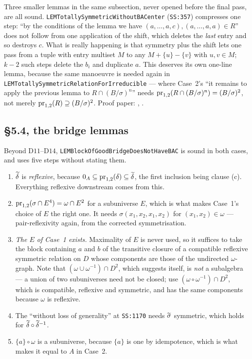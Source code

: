 Three smaller lemmas in the same subsection, never opened before the final
pass, are all sound. \texttt{LEMTotallySymmetricWithoutBACenter}
(\texttt{SS:357}) compresses one step: ``by the conditions of the lemma we have
$(a,\dots,a,c),(a,\dots,a,a)\in R$'' does not follow from one application of
the shift, which deletes the \emph{last} entry and so destroys $c$. What is
really happening is that symmetry plus the shift lets one pass from a tuple
with entry multiset $M$ to any $M+\{u\}-\{v\}$ with $u,v\in M$; $k-2$ such
steps delete the $b_{i}$ and duplicate $a$. This deserves its own one-line
lemma, because the same manoeuvre is needed again in
\texttt{LEMTotallySymmetricRelationForIrreducible} --- where Case~2's ``it
remains to apply the previous lemma to $R\cap(B/\sigma)^{n}$'' needs
$\operatorname*{pr}_{1,2}(R\cap(B/\sigma)^{n})=(B/\sigma)^{2}$, not merely
$\operatorname*{pr}_{1,2}(R)\supseteq(B/\sigma)^{2}$. Proof paper:
, .

\subsection{\S5.4, the bridge lemmas}\label{sec:exp-54}

Beyond $\mathrm D11$--$\mathrm D14$, \texttt{LEMBlockOfGoodBridgeDoesNotHaveBAC}
is sound in both cases, and uses five steps without stating them.

\begin{enumerate}\tightlist
\item $\widetilde{\delta}$ is \emph{reflexive}, because
  $0_{A}\subseteq\operatorname*{pr}_{1,2}(\delta)\subseteq\widetilde{\delta}$, the first inclusion
  being clause (c). Everything reflexive downstream comes from this.
\item $\operatorname*{pr}_{1,2}(\sigma\cap E^{4})=\omega\cap E^{2}$ for a subuniverse $E$,
  which is what makes Case~1's choice of $E$ the right one. It needs
  $\sigma(x_{1},x_{2},x_{1},x_{2})$ for $(x_{1},x_{2})\in\omega$ ---
  pair-reflexivity again, from the corrected symmetrisation.
\item \emph{The $E$ of Case~1 exists.} Maximality of $E$ is never used, so it
  suffices to take the block containing $a$ and $b$ of the transitive closure
  of a compatible reflexive symmetric relation on $D$ whose components are
  those of the undirected $\omega$-graph. Note that
  $(\omega\cup\omega^{-1})\cap D^{2}$, which suggests itself, is \emph{not} a
  subalgebra --- a union of two subuniverses need not be closed; use
  $(\omega\circ\omega^{-1})\cap D^{2}$, which is compatible, reflexive and
  symmetric, and has the same components because $\omega$ is reflexive.
\item The ``without loss of generality'' at \texttt{SS:1170} needs
  $\widetilde{\sigma}$ symmetric, which holds for $\widetilde{\delta}\circ\widetilde{\delta}^{-1}$.
\item $\{a\}\circ\omega$ is a subuniverse, because $\{a\}$ is one by
  idempotence, which is what makes it equal to $A$ in Case~2.
\end{enumerate}

